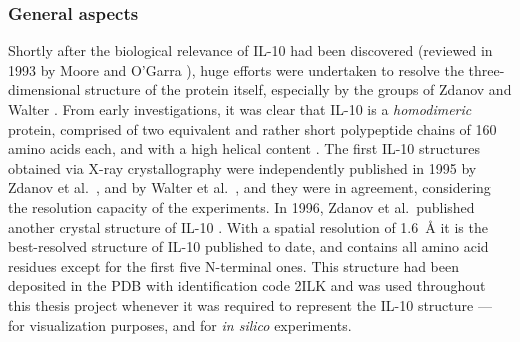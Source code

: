 \subsubsection{General aspects}
Shortly after the biological relevance of IL-10 had been discovered (reviewed in
1993 by Moore and O'Garra \cite{il10_first_review_1993}), huge efforts were
undertaken to resolve the three-dimensional structure of the protein itself,
especially by the groups of Zdanov and Walter \cite{zdanov_review_2010,
zdanov_review_2004, bookchapter_walter_il10_2004}. From early investigations, it
was clear that IL-10 is a \textit{homodimeric} protein, comprised of two
equivalent and rather short polypeptide chains of 160 amino acids each, and with
a high helical content \cite{vieira_moore_il10homodimer_1991}. The first IL-10
structures obtained via X-ray crystallography were independently published in
1995 by Zdanov et al.\ \cite{Zdanov1995}, and by Walter et al.\
\cite{il10_crystal_walter_1995}, and they were in agreement, considering the
resolution capacity of the experiments. In 1996, Zdanov et al.\ published
another crystal structure of IL-10 \cite{Zdanov1996}. With a spatial resolution
of \SI{1.6}{\angstrom} it is the best-resolved structure of IL-10 published to
date, and contains all amino acid residues except for the first five N-terminal
ones. This structure had been deposited in the PDB with identification code 2ILK
and was used throughout this thesis project whenever it was required to
represent the IL-10 structure --- for visualization purposes, and for \textit{in
silico} experiments.

